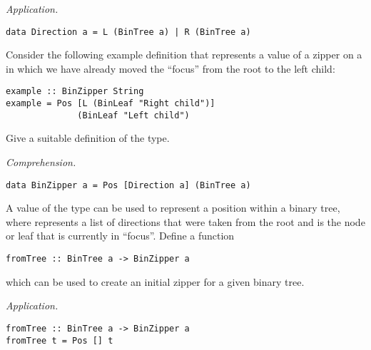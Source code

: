 \begin{parts}
\begin{subparts}
        \begin{solution}
            \emph{Application.}
            \begin{small}
                \begin{verbatim}
data Direction a = L (BinTree a) | R (BinTree a)
                \end{verbatim}
            \end{small}
        \end{solution}
    
        \subpart[1] Consider the following example definition that represents a value of a zipper on a  in which we have already moved the ``focus'' from the root to the left child:
        \vspace*{0.2cm}
        \begin{verbatim}
example :: BinZipper String
example = Pos [L (BinLeaf "Right child")] 
              (BinLeaf "Left child")
        \end{verbatim}
        \vspace*{0.2cm}
        Give a suitable definition of the  type. \droppoints
        
        \begin{solution}
            \emph{Comprehension.}
            \begin{verbatim}
data BinZipper a = Pos [Direction a] (BinTree a)
            \end{verbatim}
        \end{solution}
    
        \subpart[1] A value of the  type can be used to represent a position within a binary tree, where \haskellIn{[Direction a]} represents a list of directions that were taken from the root and  is the node or leaf that is currently in ``focus''. Define a function
        \vspace*{0.2cm}
        \begin{verbatim}
fromTree :: BinTree a -> BinZipper a
        \end{verbatim}
        \vspace*{0.2cm} 
        which can be used to create an initial zipper for a given binary tree. \droppoints 
        
        \begin{solution}
            \emph{Application.}
            \begin{small}
                \begin{verbatim}
fromTree :: BinTree a -> BinZipper a 
fromTree t = Pos [] t
                \end{verbatim}
            \end{small}
        \end{solution}
        

\end{subparts}
\end{parts}
